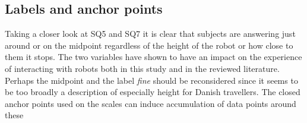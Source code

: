 \subsection{Labels and anchor points}
Taking a closer look at SQ5 and SQ7 it is clear that subjects are answering just around or on the midpoint regardless of the height of the robot or how close to them it stops. The two variables have shown to have an impact on the experience of interacting with robots both in this study and in the reviewed literature. Perhaps the midpoint and the label \textit{fine} should be reconsidered since it seems to be too broadly a description of especially height for Danish travellers. The closed anchor points used on the scales can induce accumulation of data points around these 